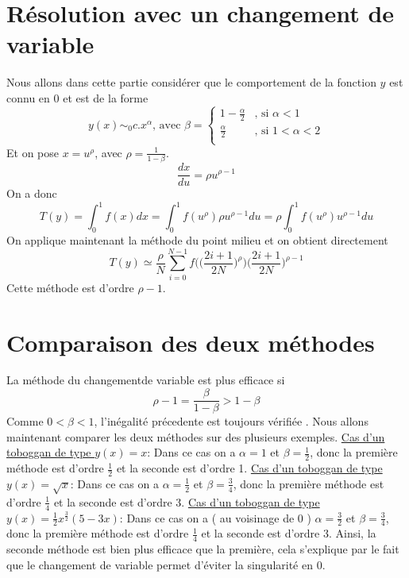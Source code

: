 \documentclass[a4paper,10pt]{article}
\begin{document}
\section{R\'esolution avec un changement de variable}
Nous allons dans cette partie consid\'erer que le comportement de la fonction $y$ est connu en 0 et est de la forme
\begin{equation}
 y(x)\sim_0 c.x^{\alpha} \text{, avec } \beta = \begin{cases}
						    1 - \frac{\alpha}{2} &\text{, si }\alpha < 1\\
						    \frac{\alpha}{2}	 &\text{, si } 1 < \alpha < 2\\
						 \end{cases}
\end{equation}
Et on pose $x = u^\rho$, avec $\rho = \frac{1}{1 - \beta}$.
\begin{equation}
 \frac{dx}{du} = \rho u^{\rho - 1}
\end{equation}
On a donc
\begin{equation}
 T(y) = \int_0^1f(x)dx = \int_0^1f(u^\rho)\rho u^{\rho - 1} du = \rho \int_0^1f(u^\rho) u^{\rho - 1} du
\end{equation}
On applique maintenant la m\'ethode du point milieu et on obtient directement 
\begin{equation}
 T(y) \simeq \frac{\rho}{N}\sum_{i=0}^{N-1}f\Bigg(\Big(\frac{2i + 1}{2N}\Big)^{\rho}\Bigg)\Big(\frac{2i + 1}{2N}\Big)^{\rho - 1}
\end{equation}
Cette m\'ethode est d'ordre $\rho - 1$.
\section{Comparaison des deux m\'ethodes}
La m\'ethode du changementde variable est plus efficace si 
\begin{equation}
 \rho - 1 = \frac{\beta}{1-\beta} > 1 - \beta
\end{equation}
Comme $0 < \beta < 1$, l'in\'egalit\'e pr\'ecedente est toujours v\'erifi\'ee . Nous allons maintenant comparer les deux m\'ethodes sur des plusieurs exemples.
\newline
\underline{Cas d'un toboggan de type $y(x) = x$}: Dans ce cas on a $\alpha = 1$ et $\beta = \frac{1}{2}$, donc la premi\`ere m\'ethode est d'ordre $\frac{1}{2}$ et la seconde est d'ordre 1. 
\newline
\underline{Cas d'un toboggan de type $y(x) = \sqrt{x}$}: Dans ce cas on a $\alpha = \frac{1}{2}$ et $\beta = \frac{3}{4}$, donc la premi\`ere m\'ethode est d'ordre $\frac{1}{4}$ et la seconde est d'ordre 3.
\newline
\underline{Cas d'un toboggan de type $y(x) = \frac{1}{2}x^{\frac{3}{2}}(5-3x)$}: Dans ce cas on a ( au voisinage de 0 ) $\alpha = \frac{3}{2}$ et $\beta = \frac{3}{4}$, donc la premi\`ere m\'ethode est d'ordre $\frac{1}{4}$ et la seconde est d'ordre 3.
\newline
Ainsi, la seconde m\'ethode est bien plus efficace que la premi\`ere, cela s'explique par le fait que le changement de variable permet d'\'eviter la singularit\'e en 0.
\end{document}
